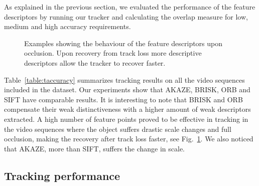As explained in the previous section, we evaluated the performance of the feature descriptors by running our tracker and calculating the overlap measure for low, medium and high accuracy requirements. 
\begin{figure}[!h]
	\vspace{2mm}
\centerline{%
	}
\caption{Examples showing the behaviour of the feature descriptors upon occlusion. Upon recovery from track loss more descriptive descriptors allow the tracker to recover faster.}
\vspace{-3mm}
\label{fig:tracking_results}
\end{figure}

Table~\ref{table:taccuracy} summarizes tracking results on all the video sequences included in the dataset.  Our experiments show that AKAZE, BRISK, ORB and SIFT have comparable results. It is interesting to note that BRISK and ORB compensate their weak distinctiveness with a higher amount of weak descriptors extracted. A high number of feature points proved to be effective in tracking in the video sequences where the object suffers drastic scale changes and full occlusion, making the recovery after track loss faster, see Fig.~\ref{fig:tracking_results}. We also noticed that AKAZE, more than SIFT, suffers the change in scale. 

\subsection{Tracking performance}

